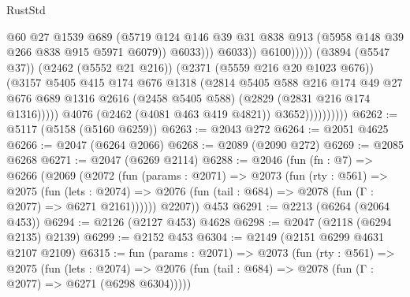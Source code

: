 \begin{lexlean}{RustStd}
\begin{coremodule}
                                              @60
                                              @27
                                              @1539
                                              @689
                                              (@5719
                                                @124
                                                @146
                                                @39
                                                @31
                                                @838
                                                @913
                                                (@5958 @148 @39 @266 @838 @915 @5971 @6079))
                                              @6033)))
                                        @6033))
                                    @6100)))))
                          (@3894 (@5547 @37))
                          (@2462 (@5552 @21 @216))
                          (@2371 (@5559 @216 @20 @1023 @676))
                          (@3157
                            @5405
                            @415
                            @174
                            @676
                            @1318
                            (@2814
                              @5405
                              @588
                              @216
                              @174
                              @49
                              @27
                              @676
                              @689
                              @1316
                              @2616
                              (@2458 @5405 @588)
                              (@2829 (@2831 @216 @174 @1316)))))
                        @4076
                        (@2462 (@4081 @463 @419 @4821))
                        @3652))))))))))
@6262 := @5117 (@5158 (@5160 @6259))
@6263 := @2043 @272
@6264 := @2051 @4625
@6266 := @2047 (@6264 @2066)
@6268 := @2089 (@2090 @272)
@6269 := @2085 @6268
@6271 := @2047 (@6269 @2114)
@6288 := @2046
    (fun (fn : @7) =>
    @6266
      (@2069
        (@2072
          (fun (params : @2071) =>
          @2073
            (fun (rty : @561) =>
            @2075
              (fun (lets : @2074) =>
              @2076 (fun (tail : @684) => @2078 (fun (Γ : @2077) => @6271 @2161))))))
        @2207))
    @453
@6291 := @2213 (@6264 (@2064 @453))
@6294 := @2126 (@2127 @453) @4628
@6298 := @2047 (@2118 (@6294 @2135) @2139)
@6299 := @2152 @453
@6304 := @2149 (@2151 @6299 @4631 @2107 @2109)
@6315 := fun (params : @2071) =>
  @2073
    (fun (rty : @561) =>
    @2075
      (fun (lets : @2074) =>
      @2076 (fun (tail : @684) => @2078 (fun (Γ : @2077) => @6271 (@6298 @6304)))))

\end{coremodule}
\end{lexlean}
